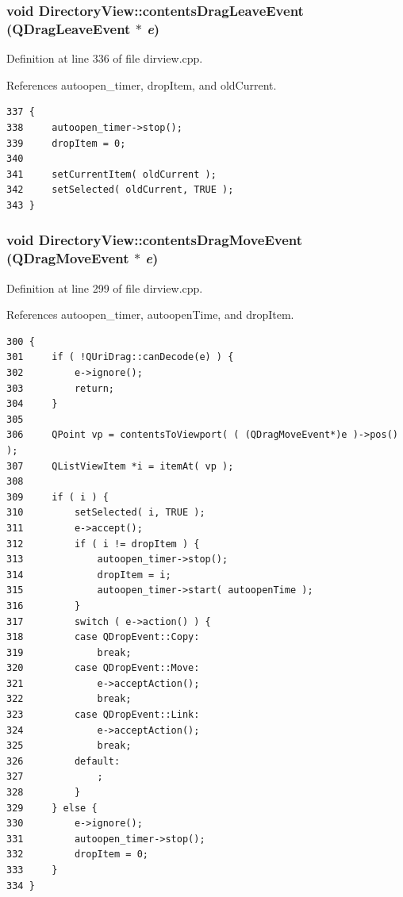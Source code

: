 \subsubsection{\setlength{\rightskip}{0pt plus 5cm}void Directory\-View::contents\-Drag\-Leave\-Event (QDrag\-Leave\-Event $\ast$ {\em e})\hspace{0.3cm}{\tt  [protected]}}\label{classDirectoryView_DirectoryViewb2}




Definition at line 336 of file dirview.cpp.

References autoopen\_\-timer, drop\-Item, and old\-Current.



\footnotesize\begin{verbatim}337 {
338     autoopen_timer->stop();
339     dropItem = 0;
340 
341     setCurrentItem( oldCurrent );
342     setSelected( oldCurrent, TRUE );
343 }
\end{verbatim}\normalsize 
{}
\subsubsection{\setlength{\rightskip}{0pt plus 5cm}void Directory\-View::contents\-Drag\-Move\-Event (QDrag\-Move\-Event $\ast$ {\em e})\hspace{0.3cm}{\tt  [protected]}}\label{classDirectoryView_DirectoryViewb1}




Definition at line 299 of file dirview.cpp.

References autoopen\_\-timer, autoopen\-Time, and drop\-Item.



\footnotesize\begin{verbatim}300 {
301     if ( !QUriDrag::canDecode(e) ) {
302         e->ignore();
303         return;
304     }
305 
306     QPoint vp = contentsToViewport( ( (QDragMoveEvent*)e )->pos() );
307     QListViewItem *i = itemAt( vp );
308     
309     if ( i ) {
310         setSelected( i, TRUE );
311         e->accept();
312         if ( i != dropItem ) {
313             autoopen_timer->stop();
314             dropItem = i;
315             autoopen_timer->start( autoopenTime );
316         }
317         switch ( e->action() ) {
318         case QDropEvent::Copy:
319             break;
320         case QDropEvent::Move:
321             e->acceptAction();
322             break;
323         case QDropEvent::Link:
324             e->acceptAction();
325             break;
326         default:
327             ;
328         }
329     } else {
330         e->ignore();
331         autoopen_timer->stop();
332         dropItem = 0;
333     }
334 }
\end{verbatim}\normalsize 
{}
